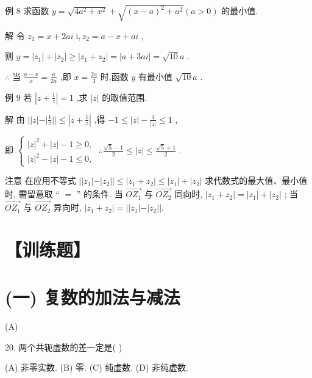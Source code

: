 \documentclass[10pt]{article}
\begin{document}
例 8 求函数 \(y = \sqrt{4{a}^{2} + {x}^{2}} + \sqrt{{\left( x - a\right) }^{2} + {a}^{2}}\left( {a > 0}\right)\) 的最小值.

解 令 \({z}_{1} = x + {2ai}\mathrm{\;i},{z}_{2} = a - x + {ai}\) ,

则 \(y = \left| {z}_{1}\right|  + \left| {z}_{2}\right|  \geq  \left| {{z}_{1} + {z}_{2}}\right|  = \left| {a + {3ai}}\right|  = \sqrt{10}a\) .

\(\therefore\) 当 \(\frac{a - x}{x} = \frac{a}{2a}\) ,即 \(x = \frac{2a}{3}\) 时,函数 \(y\) 有最小值 \(\sqrt{10}a\) .

例 9 若 \(\left| {z + \frac{1}{z}}\right|  = 1\) ,求 \(\left| z\right|\) 的取值范围.

解 由 \(\left| \right| z\left| -\right| \frac{1}{z}\left| \right|  \leq  \left| {z + \frac{1}{z}}\right|\) ,得 \(- 1 \leq  \left| z\right|  - \frac{1}{\left| z\right| } \leq  1\) ,

即 \(\left\{  {\begin{array}{l} {\left| z\right| }^{2} + \left| z\right|  - 1 \geq  0, \\  {\left| z\right| }^{2} - \left| z\right|  - 1 \leq  0, \end{array}\;\therefore \frac{\sqrt{5} - 1}{2} \leq  \left| z\right|  \leq  \frac{\sqrt{5} + 1}{2}}\right.\) .

注意 在应用不等式 \(\left| \right| {z}_{1}\left| -\right| {z}_{2}\left| \right|  \leq  \left| {{z}_{1} + {z}_{2}}\right|  \leq  \left| {z}_{1}\right|  + \left| {z}_{2}\right|\) 求代数式的最大值、最小值时, 需留意取 “ \(=\) ” 的条件. 当 \(\overrightarrow{O{Z}_{1}}\) 与 \(\overrightarrow{O{Z}_{2}}\) 同向时, \(\left| {{z}_{1} + {z}_{2}}\right|  = \left| {z}_{1}\right|  + \left| {z}_{2}\right|\) ; 当 \(\overrightarrow{O{Z}_{1}}\) 与 \(\overrightarrow{O{Z}_{2}}\) 异向时, \(\left| {{z}_{1} + {z}_{2}}\right|  = \left| \right| {z}_{1}\left| -\right| {z}_{2}\left| \right| .\)

\section*{【训练题】}

\section*{(一) 复数的加法与减法}

(A)

20. 两个共轭虚数的差一定是( )

(A) 非零实数. (B) 零. (C) 纯虚数. (D) 非纯虚数.
\end{document}
